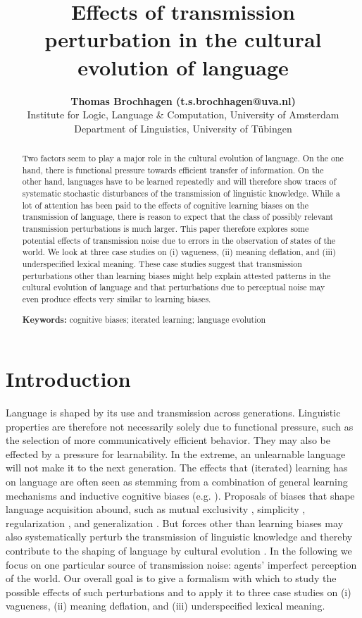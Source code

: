\documentclass[10pt,a4paper]{article}
\title{Effects of transmission perturbation in the cultural evolution of language}
\author{{\large \bf Thomas Brochhagen (t.s.brochhagen@uva.nl)}\\
  Institute for Logic, Language \& Computation, University of Amsterdam
  \AND {\large \bf Michael Franke (mchfranke@gmail.com)} \\
  Department of Linguistics, University of T\"{u}bingen}
\begin{document}
\maketitle

\begin{abstract}
  Two factors seem to play a major role in the cultural evolution of language. On the one hand,
  there is functional pressure towards efficient transfer of information. On the other hand,
  languages have to be learned repeatedly and will therefore show traces of systematic
  stochastic disturbances of the transmission of linguistic knowledge. While a lot of attention
  has been paid to the effects of cognitive learning biases on the transmission of language,
  there is reason to expect that the class of possibly relevant transmission perturbations is
  much larger. This paper therefore explores some potential effects of transmission noise due
  to errors in the observation of states of the world. We look at three case studies on (i)
  vagueness, (ii) meaning deflation, and (iii) underspecified lexical meaning. These case
  studies suggest that transmission perturbations other than learning biases might help explain
  attested patterns in the cultural evolution of language and that perturbations due to
  perceptual noise may even produce effects very similar to learning biases.

\textbf{Keywords:} 
cognitive biases; iterated learning; language evolution  
\end{abstract}


\section{Introduction}

Language is shaped by its use and transmission across generations. Linguistic properties are
therefore not necessarily solely due to functional pressure, such as the selection of more
communicatively efficient behavior. They may also be effected by a pressure for
learnability. In the extreme, an unlearnable language will not make it to the next
generation. The effects that (iterated) learning has on language are often seen as stemming
from a combination of general learning mechanisms and inductive cognitive biases
(e.g. \citealt{griffiths+kalish:2007,kirby+etal:2014,tamariz+kirby:2016}). Proposals of biases
that shape language acquisition abound, such as mutual exclusivity
\citep{merriman+bowman:1989,clark:2009}, simplicity \citep{kirby+etal:2015}, regularization
\citep{hudson+etal:2005}, and generalization \citep{smith:2011}. But forces other than learning biases may also systematically perturb the transmission of
linguistic knowledge and thereby contribute to the shaping of language by
cultural evolution \citep{reali+griffiths:2009,perfors+navarro:2014}.  In the following we focus on one particular source of transmission noise:
agents' imperfect perception of the world. Our overall goal is to give a
formalism with which to study the possible effects of such perturbations and to apply it to
three case studies on (i) vagueness, (ii) meaning deflation, and (iii) underspecified lexical
meaning.
\end{document}
